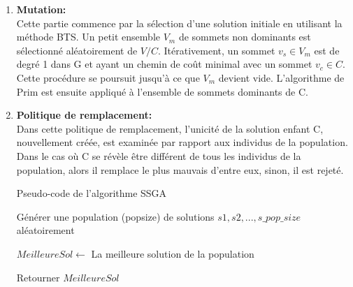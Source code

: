 \begin{enumerate}[label=\alph*)]
	 \item \textbf{Mutation: }\\
	Cette partie commence par la sélection d’une solution initiale en utilisant la méthode BTS. Un petit ensemble $V_m$ de sommets non dominants est sélectionné aléatoirement de $V / C$.  Itérativement, un sommet $v_s \in V_m$ est de degré 1 dans G et ayant un chemin de coût minimal avec un sommet $v_c \in C$. Cette procédure se poursuit jusqu’à ce que $V_m$  devient vide. L’algorithme de Prim est ensuite appliqué à l’ensemble de sommets dominants de C.
	
	\item \textbf{Politique de remplacement:}\\
	Dans cette politique de remplacement, l’unicité de la solution enfant C, nouvellement créée, est examinée par rapport aux individus de la population. Dans le cas où C se révèle être différent de tous les individus de la population, alors il remplace le plus mauvais d’entre eux, sinon, il est rejeté.
	

\begin{algorithm}[H]
\label{alg3:PCASSGA}
\caption{ Pseudo-code de l'algorithme SSGA}
\SetAlgoLined
\DontPrintSemicolon

Générer une population (popsize) de solutions $s1 , s2 , ..., s\_pop\_size$ aléatoirement \;

$MeilleureSol \gets $ La meilleure solution de la population \;


Retourner $MeilleureSol$ \;

\end{algorithm}


\end{enumerate}




